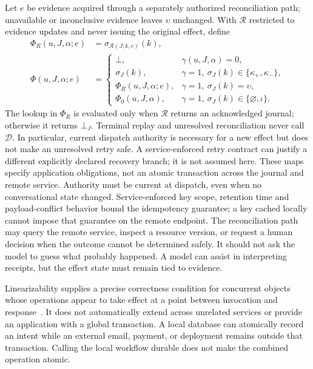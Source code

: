 Let $e$ be evidence acquired through a separately authorized reconciliation path; unavailable or inconclusive evidence leaves $\upsilon$ unchanged. With $\mathcal R$ restricted to evidence updates and never issuing the original effect, define
\begin{equation}
\begin{aligned}
 \Phi_R(u,J,\alpha;e)&=\sigma_{\mathcal R(J;k,e)}(k),\\
 \Phi(u,J,\alpha;e)&=
 \begin{cases}
  \bot,&\gamma(u,J,\alpha)=0,\\
  \sigma_J(k),&\gamma=1,\ \sigma_J(k)\in\{\kappa_+,\kappa_-\},\\
  \Phi_R(u,J,\alpha;e),&\gamma=1,\ \sigma_J(k)=\upsilon,\\
  \Phi_0(u,J,\alpha),&\gamma=1,\ \sigma_J(k)\in\{\varnothing,\iota\}.
 \end{cases}
\end{aligned}
\label{eq:C13:evidence_reconciliation}
\end{equation}
The lookup in $\Phi_R$ is evaluated only when $\mathcal R$ returns an acknowledged journal; otherwise it returns $\bot_J$. Terminal replay and unresolved reconciliation never call $\mathcal D$. In particular, current dispatch authority is necessary for a new effect but does not make an unresolved retry safe. A service-enforced retry contract can justify a different explicitly declared recovery branch; it is not assumed here. These maps specify application obligations, not an atomic transaction across the journal and remote service. Authority must be current at dispatch, even when no conversational state changed. Service-enforced key scope, retention time and payload-conflict behavior bound the idempotency guarantee; a key cached locally cannot impose that guarantee on the remote endpoint.
The reconciliation path may query the remote service, inspect a resource version, or request a human decision when the outcome cannot be determined safely. It should not ask the model to guess what probably happened. A model can assist in interpreting receipts, but the effect state must remain tied to evidence.

Linearizability supplies a precise correctness condition for concurrent objects whose operations appear to take effect at a point between invocation and response~\cite{herlihy1990linearizability}. It does not automatically extend across unrelated services or provide an application with a global transaction. A local database can atomically record an intent while an external email, payment, or deployment remains outside that transaction. Calling the local workflow durable does not make the combined operation atomic.

